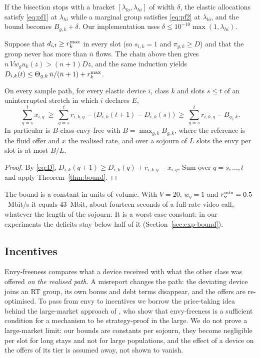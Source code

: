 \begin{remark}\label{rem:tol}
If the bisection stops with a bracket $[\lambda_{lo},\lambda_{hi}]$ of width $\delta$, the elastic allocations satisfy \eqref{eq:pf1} at $\lambda_{hi}$ while a marginal group satisfies \eqref{eq:pf2} at $\lambda_{lo}$, and the bound becomes $B_{g,k}+\delta$. Our implementation uses $\delta\le10^{-10}\max(1,\lambda_{hi})$.
\end{remark}

\begin{remark}\label{rem:sharp}
Suppose that $d_{i,t}\ge r^{\max}_k$ in every slot (so $s_{i,k}=1$ and $\pi_{g,k}\ge D$) and that the group never has more than $\bar n$ flows. The chain above then gives $n\,Vw_gu_k(z)>(n+1)Dz$, and the same induction yields $D_{i,k}(t)\le\Theta_{g,k}\,\bar n/(\bar n+1)+r^{\max}_k$.
\end{remark}

\begin{corollary}\label{cor:window}
On every sample path, for every elastic device $i$, class $k$ and slots $s\le t$ of an uninterrupted stretch in which $i$ declares $E$,
\[
\sum_{q=s}^{t}x_{i,q}\ \ge\ \sum_{q=s}^{t}r_{i,k,q}-\big(D_{i,k}(t+1)-D_{i,k}(s)\big)\ \ge\ \sum_{q=s}^{t}r_{i,k,q}-B_{g_i,k}.
\]
In particular \repay{} is $B$-class-envy-free with $B=\max_{g,k}B_{g,k}$, where the reference is the fluid offer and $x$ the realised rate, and over a sojourn of $L$ slots the envy per slot is at most $B/L$.
\end{corollary}
\begin{proof}
By \eqref{eq:D}, $D_{i,k}(q+1)\ge D_{i,k}(q)+r_{i,k,q}-x_{i,q}$. Sum over $q=s,\dots,t$ and apply Theorem~\ref{thm:bound}.
\end{proof}

The bound is a constant in units of volume. With $V=20$, $w_g=1$ and $r^{\min}_{\mathrm{v}}=0.5$~Mbit/s it equals $43$~Mbit, about fourteen seconds of a full-rate video call, whatever the length of the sojourn. It is a worst-case constant: in our experiments the deficits stay below half of it (Section~\ref{sec:exp-bound}).

\subsection{Incentives}\label{sec:ic}

Envy-freeness compares what a device received with what the other class was offered \emph{on the realised path}.
A misreport changes the path: the deviating device joins an RT group, its own bonus and debt terms disappear, and the offers are re-optimised.
To pass from envy to incentives we borrow the price-taking idea behind the large-market approach of \citet{azevedo2019strategy}, who show that envy-freeness is a sufficient condition for a mechanism to be strategy-proof in the large.
We do not prove a large-market limit: our bounds are constants per sojourn, they become negligible per slot for long stays and not for large populations, and the effect of a device on the offers of its tier is assumed away, not shown to vanish.


